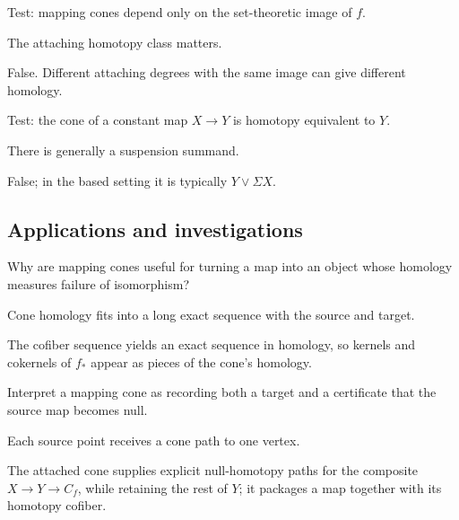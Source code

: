\begin{exercise}\label{exr:viii07-ped-11}
Test: mapping cones depend only on the set-theoretic image of $f$.
\end{exercise}
\begin{hint}
The attaching homotopy class matters.
\end{hint}
\begin{solution}
False. Different attaching degrees with the same image can give different homology.
\end{solution}

\begin{exercise}\label{exr:viii07-ped-12}
Test: the cone of a constant map $X\to Y$ is homotopy equivalent to $Y$.
\end{exercise}
\begin{hint}
There is generally a suspension summand.
\end{hint}
\begin{solution}
False; in the based setting it is typically $Y\vee\Sigma X$.
\end{solution}

\subsection*{Applications and investigations}

\begin{exercise}\label{exr:viii07-ped-13}
Why are mapping cones useful for turning a map into an object whose homology measures failure of isomorphism?
\end{exercise}
\begin{hint}
Cone homology fits into a long exact sequence with the source and target.
\end{hint}
\begin{solution}
The cofiber sequence yields an exact sequence in homology, so kernels and cokernels of $f_*$ appear as pieces of the cone's homology.
\end{solution}

\begin{exercise}\label{exr:viii07-ped-14}
Interpret a mapping cone as recording both a target and a certificate that the source map becomes null.
\end{exercise}
\begin{hint}
Each source point receives a cone path to one vertex.
\end{hint}
\begin{solution}
The attached cone supplies explicit null-homotopy paths for the composite $X\to Y\to C_f$, while retaining the rest of $Y$; it packages a map together with its homotopy cofiber.
\end{solution}

